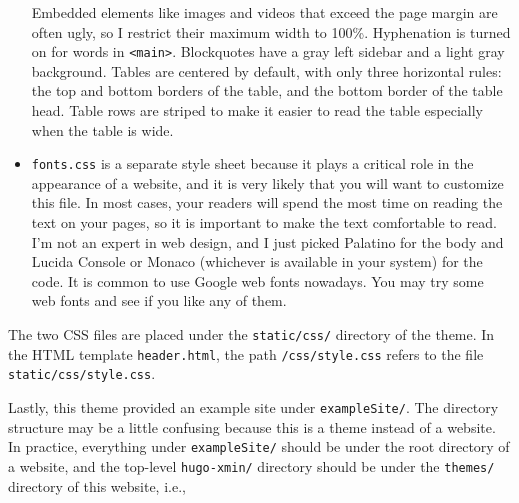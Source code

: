 \documentclass[12pt,]{krantz}
\makeatletter
\newenvironment{Shaded}{\begin{snugshade}}{\end{snugshade}}
\newcommand{\DecValTok}[1]{\textcolor[rgb]{0.00,0.00,0.81}{#1}}
\newcommand{\KeywordTok}[1]{\textcolor[rgb]{0.13,0.29,0.53}{\textbf{#1}}}
\newcommand{\NormalTok}[1]{#1}
\newcommand{\StringTok}[1]{\textcolor[rgb]{0.31,0.60,0.02}{#1}}
\newenvironment{kframe}{%
\medskip{}
\setlength{\fboxsep}{.8em}
 \def\at@end@of@kframe{}%
 \ifinner\ifhmode%
  \def\at@end@of@kframe{\end{minipage}}%
  \begin{minipage}{\columnwidth}%
 \fi\fi%
 \def\FrameCommand##1{\hskip\@totalleftmargin \hskip-\fboxsep
 \colorbox{shadecolor}{##1}\hskip-\fboxsep
     \hskip-\linewidth \hskip-\@totalleftmargin \hskip\columnwidth}%
 \MakeFramed {\advance\hsize-\width
   \@totalleftmargin\z@ \linewidth\hsize
   \@setminipage}}%
 {\par\unskip\endMakeFramed%
 \at@end@of@kframe}
\renewenvironment{Shaded}{\begin{kframe}}{\end{kframe}}
\theoremstyle{definition}
\theoremstyle{definition}
\theoremstyle{definition}
\theoremstyle{remark}
\makeatother
\begin{document}
\begin{itemize}
  Embedded elements like images and videos that exceed the page margin
  are often ugly, so I restrict their maximum width to 100\%.
  Hyphenation is turned on for words in
  \texttt{\textless{}main\textgreater{}}. Blockquotes have a gray left
  sidebar and a light gray background. Tables are centered by default,
  with only three horizontal rules: the top and bottom borders of the
  table, and the bottom border of the table head. Table rows are striped
  to make it easier to read the table especially when the table is wide.
\item
  \texttt{fonts.css} is a separate style sheet because
  it plays a critical role in the appearance of a website, and it is
  very likely that you will want to customize this file. In most cases,
  your readers will spend the most time on reading the text on your
  pages, so it is important to make the text comfortable to read. I'm
  not an expert in web design, and I just picked Palatino for the body
  and Lucida Console or Monaco (whichever is available in your system)
  for the code. It is common to use Google web fonts nowadays. You may
  try some web fonts and see if you like any of them.

\begin{Shaded}
\end{Shaded}
\end{itemize}

The two CSS files are placed under the \texttt{static/css/} directory of
the theme. In the HTML template \texttt{header.html}, the path
\texttt{/css/style.css} refers to the file
\texttt{static/css/style.css}.

Lastly, this theme provided an example site under \texttt{exampleSite/}.
The directory structure may be a little confusing because this is a
theme instead of a website. In practice, everything under
\texttt{exampleSite/} should be under the root directory of a website,
and the top-level \texttt{hugo-xmin/} directory should be under the
\texttt{themes/} directory of this website, i.e.,
\end{document}
